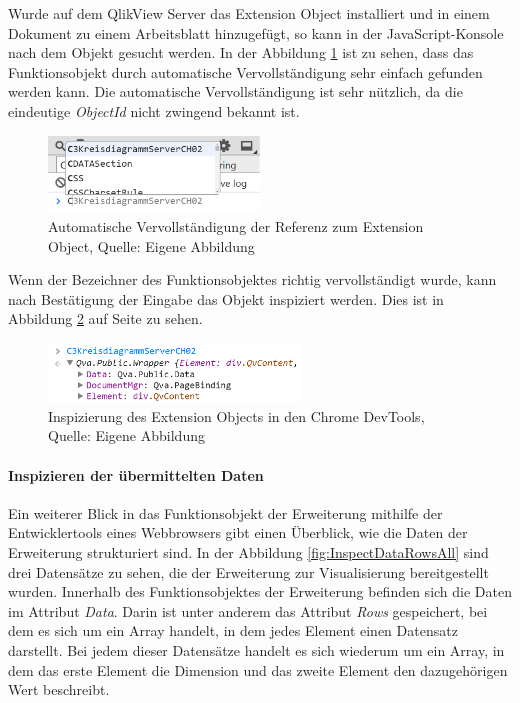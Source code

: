 Wurde auf dem QlikView Server das Extension Object installiert und in einem Dokument zu einem Arbeitsblatt hinzugefügt, so kann in der JavaScript-Konsole nach dem Objekt gesucht werden. In der Abbildung \ref{fig:AutoCompl} ist zu sehen, dass das Funktionsobjekt durch automatische Vervollständigung sehr einfach gefunden werden kann. Die automatische Vervollständigung ist sehr nützlich, da die eindeutige \textit{ObjectId} nicht zwingend bekannt ist.

\ifIncludeFigures\begin{figure}[htbp]
	\centering
		\includegraphics[width=0.50\textwidth]{./img/DevTools/AutoCompl.png}
	\caption[Automatische Vervollständigung der Referenz zum Extension Object]{Automatische Vervollständigung der Referenz zum Extension Object, Quelle: Eigene Abbildung}
	\label{fig:AutoCompl}
\end{figure}\fi


Wenn der Bezeichner des Funktionsobjektes richtig vervollständigt wurde, kann nach Bestätigung der Eingabe das Objekt inspiziert werden. Dies ist in Abbildung \ref{fig:InspectExtensionObject} auf Seite \pageref{fig:InspectExtensionObject} zu sehen.

\ifIncludeFigures\begin{figure}[htbp]
	\centering
		\includegraphics[width=0.60\textwidth]{./img/DevTools/Inspect.png}
	\caption[Inspizierung des Extension Objects in den Chrome DevTools]{Inspizierung des Extension Objects in den Chrome DevTools, \\Quelle: Eigene Abbildung}
	\label{fig:InspectExtensionObject}
\end{figure}\fi


\paragraph{Inspizieren der übermittelten Daten}
\label{lab:InspizierenDerUebermitteltenDaten} 

Ein weiterer Blick in das Funktionsobjekt der Erweiterung mithilfe der Entwicklertools eines Webbrowsers gibt einen Überblick, wie die Daten der Erweiterung strukturiert sind. In der Abbildung \ref{fig:InspectDataRowsAll} sind drei Daten\-sätze zu sehen, die der Erweiterung zur Visualisierung bereitgestellt wurden. Innerhalb des Funktionsobjektes der Erweiterung befinden sich die Daten im Attribut \textit{Data}. Darin ist unter anderem das Attribut \textit{Rows} gespeichert, bei dem es sich um ein Array handelt, in dem jedes Element einen Daten\-satz darstellt. Bei jedem dieser Daten\-sätze handelt es sich wiederum um ein Array, in dem das erste Element die Dimension und das zweite Element den dazugehörigen Wert beschreibt.

